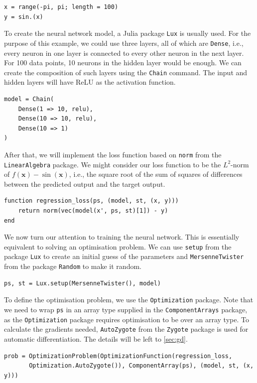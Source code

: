 \documentclass[a4paper,11pt,titlepage]{article}
\theoremstyle{definition}
\theoremstyle{plain}
\theoremstyle{remark}
\begin{document}
\begin{verbatim}
x = range(-pi, pi; length = 100)
y = sin.(x)
\end{verbatim}

To create the neural network model, a Julia package \verb|Lux| is usually used. For the purpose of this example, we could use three layers, all of which are \verb|Dense|, i.e., every neuron in one layer is connected to every other neuron in the next layer. For 100 data points, 10 neurons in the hidden layer would be enough. We can create the composition of such layers using the \verb|Chain| command. The input and hidden layers will have ReLU as the activation function.

\begin{verbatim}
model = Chain(
    Dense(1 => 10, relu),
    Dense(10 => 10, relu),
    Dense(10 => 1)
)
\end{verbatim}

After that, we will implement the loss function based on \verb|norm| from the \verb|LinearAlgebra| package. We might consider our loss function to be the $L^2$-norm of $f(\mathbf{x}) - \sin (\mathbf{x})$, i.e., the square root of the sum of squares of differences between the predicted output and the target output.

\begin{verbatim}
function regression_loss(ps, (model, st, (x, y)))
    return norm(vec(model(x', ps, st)[1]) - y)
end
\end{verbatim}

We now turn our attention to training the neural network. This is essentially equivalent to solving an optimisation problem. We can use \verb|setup| from the package \verb|Lux| to create an initial guess of the parameters and \verb|MersenneTwister| from the package \verb|Random| to make it random.

\begin{verbatim}
ps, st = Lux.setup(MersenneTwister(), model)
\end{verbatim}

To define the optimisation problem, we use the \verb|Optimization| package. Note that we need to wrap \verb|ps| in an array type supplied in the \verb|ComponentArrays| package, as the \verb|Optimization| package requires optimisation to be over an array type. To calculate the gradients needed, \verb|AutoZygote| from the \verb|Zygote| package is used for automatic differentiation. The details will be left to \ref{sec:gd}.

\begin{verbatim}
prob = OptimizationProblem(OptimizationFunction(regression_loss,
       Optimization.AutoZygote()), ComponentArray(ps), (model, st, (x, y)))
\end{verbatim}
\end{document}
